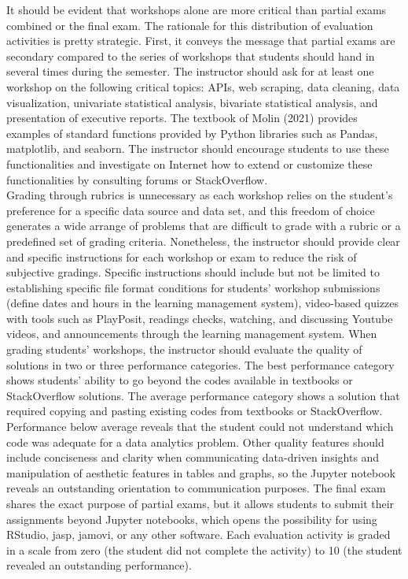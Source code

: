 \documentclass[letterpaper,11pt]{article}
\begin{document}
It should be evident that workshops alone are more critical than partial exams combined or the final exam. The rationale for this distribution of evaluation activities is pretty strategic. First, it conveys the message that partial exams are secondary compared to the series of workshops that students should hand in several times during the semester. The instructor should ask for at least one workshop on the following critical topics: APIs, web scraping, data cleaning, data visualization, univariate statistical analysis, bivariate statistical analysis, and presentation of executive reports.
\newpage
The textbook of Molin (2021) provides examples of standard functions provided by Python libraries such as Pandas, matplotlib, and seaborn. The instructor should encourage students to use these functionalities and investigate on Internet how to extend or customize these functionalities by consulting forums or StackOverflow. \\
\vspace{0.3cm}
Grading through rubrics is unnecessary as each workshop relies on the student's preference for a specific data source and data set, and this freedom of choice generates a wide arrange of problems that are difficult to grade with a rubric or a predefined set of grading criteria. Nonetheless, the instructor should provide clear and specific instructions for each workshop or exam to reduce the risk of subjective gradings. Specific instructions should include but not be limited to establishing specific file format conditions for students' workshop submissions (define dates and hours in the learning management system), video-based quizzes with tools such as PlayPosit, readings checks, watching, and discussing Youtube videos, and announcements through the learning management system. When grading students' workshops, the instructor should evaluate the quality of solutions in two or three performance categories. The best performance category shows students' ability to go beyond the codes available in textbooks or StackOverflow solutions. The average performance category shows a solution that required copying and pasting existing codes from textbooks or StackOverflow. Performance below average reveals that the student could not understand which code was adequate for a data analytics problem. Other quality features should include conciseness and clarity when communicating data-driven insights and manipulation of aesthetic features in tables and graphs, so the Jupyter notebook reveals an outstanding orientation to communication purposes. The final exam shares the exact purpose of partial exams, but it allows students to submit their assignments beyond Jupyter notebooks, which opens the possibility for using RStudio, jasp, jamovi, or any other software. Each evaluation activity is graded in a scale from zero (the student did not complete the activity) to 10 (the student revealed an outstanding performance).
\end{document}

